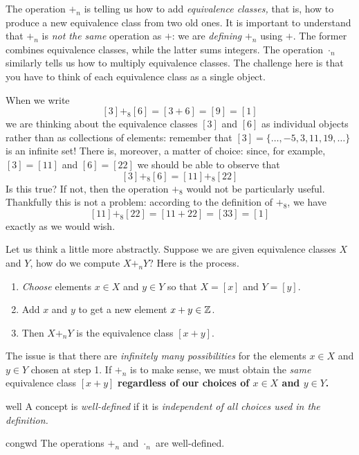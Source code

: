 The operation $+_n$ is telling us how to add \emph{equivalence classes,} that is, how to produce a new equivalence class from two old ones. It is important to understand that $+_n$ is \emph{not the same} operation as $+$: we are \emph{defining} $+_n$ using $+$. The former combines equivalence classes, while the latter sums integers. The operation $\cdot_n$ similarly tells us how to multiply equivalence classes. The challenge here is that you have to think of each equivalence class as a single object. 

\begin{example}{}{}
	When we write
	\[
		[3]+_8[6]=[3+6]=[9]=[1]
	\]
	we are thinking about the equivalence classes $[3]$ and $[6]$ as individual objects rather than as collections of elements: remember that $[3]=\{\ldots,-5,3,11,19,\ldots\}$ is an infinite set! There is, moreover, a matter of choice: since, for example, $[3]=[11]$ and $[6]=[22]$ we should be able to observe that
	\[
		[3]+_8[6]=[11]+_8[22]
	\]
	Is this true? If not, then the operation $+_8$ would not be particularly useful. Thankfully this is not a problem: according to the definition of $+_8$, we have
	\[
		[11]+_8[22]=[11+22]=[33]=[1]
	\]
	exactly as we would wish.
\end{example}

Let us think a little more abstractly. Suppose we are given equivalence classes $X$ and $Y$, how do we compute $X+_nY$? Here is the process.
\begin{enumerate}
  \item \emph{Choose} elements $x\in X$ and $y\in Y$ so that $X=[x]$ and $Y=[y]$.
  \item Add $x$ and $y$ to get a new element $x+y\in\mathbb{Z}$.
  \item Then $X+_nY$ is the equivalence class $[x+y]$.
\end{enumerate}
The issue is that there are \emph{infinitely many possibilities} for the elements $x\in X$ and $y\in Y$ chosen at step 1. If $+_n$ is to make sense, we must obtain the \emph{same} equivalence class $[x+y]$ {\bf regardless of our choices of $x\in X$ and $y\in Y$.}

\begin{defn}{}{well}
	A concept is \emph{well-defined} if it is \emph{independent of all choices used in the definition.}
\end{defn}

\begin{thm}{}{congwd}
	The operations $+_n$ and $\cdot_n$ are well-defined.
\end{thm}

